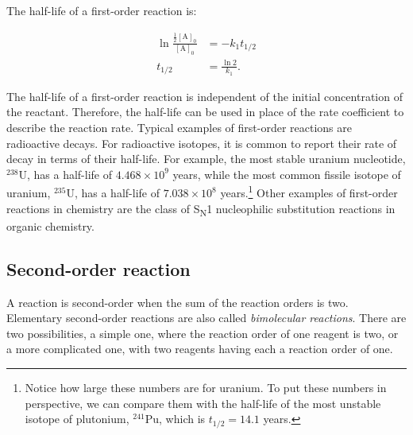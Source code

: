 \documentclass[
  9pt,
]{extbook}
\theoremstyle{definition}
\theoremstyle{definition}
\theoremstyle{definition}
\theoremstyle{remark}
\begin{document}
The half-life of a first-order reaction is:

\begin{equation}
\begin{aligned}
\ln \frac{\frac{1}{2}[\mathrm{A}]_0}{[\mathrm{A}]_0}&=-k_1 t_{1/2}\\
t_{1/2} &= \frac{\ln 2}{k_1}.
\end{aligned}
\label{eq:kin8}
\end{equation}

The half-life of a first-order reaction is independent of the initial concentration of the reactant. Therefore, the half-life can be used in place of the rate coefficient to describe the reaction rate. Typical examples of first-order reactions are radioactive decays. For radioactive isotopes, it is common to report their rate of decay in terms of their half-life. For example, the most stable uranium nucleotide, \(^{238}\mathrm{U}\), has a half-life of \(4.468\times 10^9\) years, while the most common fissile isotope of uranium, \(^{235}\mathrm{U}\), has a half-life of \(7.038\times 10^8\) years.\footnote{Notice how large these numbers are for uranium. To put these numbers in perspective, we can compare them with the half-life of the most unstable isotope of plutonium, \(^{241}\mathrm{Pu}\), which is \(t_{1/2}=14.1\) years.} Other examples of first-order reactions in chemistry are the class of S\textsubscript{N}1 nucleophilic substitution reactions in organic chemistry.

\hypertarget{second-order-reaction}{%
\subsection{Second-order reaction}\label{second-order-reaction}}

A reaction is second-order when the sum of the reaction orders is two. Elementary second-order reactions are also called \emph{bimolecular reactions}. There are two possibilities, a simple one, where the reaction order of one reagent is two, or a more complicated one, with two reagents having each a reaction order of one.
\end{document}
